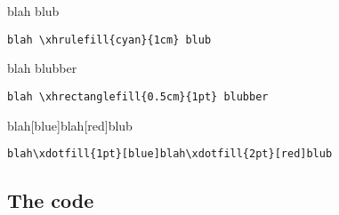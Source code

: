 \documentclass[12pt]{article}
\begin{document}
blah  blub
\begin{lstlisting}
blah \xhrulefill{cyan}{1cm} blub
\end{lstlisting}

blah \xhrectanglefill{0.5cm}{1pt} blubber
\begin{lstlisting}
blah \xhrectanglefill{0.5cm}{1pt} blubber
\end{lstlisting}

blah\xdotfill{1pt}[blue]blah\xdotfill{2pt}[red]blub
\begin{lstlisting}
blah\xdotfill{1pt}[blue]blah\xdotfill{2pt}[red]blub
\end{lstlisting}


\subsection*{The code}


\end{document}
